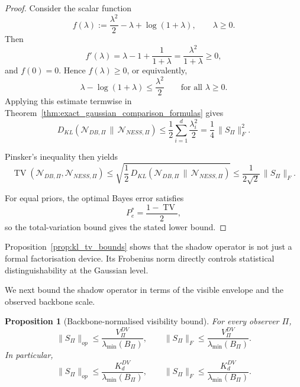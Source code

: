 \documentclass[11pt,a4paper]{article}
\numberwithin{equation}{section}
\theoremstyle{thmcompact}
\newtheorem{proposition}[theorem]{Proposition}
\theoremstyle{remark}
\begin{document}
\begin{proof}
Consider the scalar function
\begin{equation}
f(\lambda):=\frac{\lambda^2}{2}-\lambda+\log(1+\lambda),
\qquad \lambda\ge 0.
\end{equation}
Then
\begin{equation}
f'( \lambda)=\lambda-1+\frac{1}{1+\lambda}
=
\frac{\lambda^2}{1+\lambda}\ge 0,
\end{equation}
and \(f(0)=0\). Hence \(f(\lambda)\ge 0\), or equivalently,
\begin{equation}
\lambda-\log(1+\lambda)\le \frac{\lambda^2}{2}
\qquad\text{for all }\lambda\ge 0.
\end{equation}
Applying this estimate termwise in Theorem~\ref{thm:exact_gaussian_comparison_formulas} gives
\begin{equation}
D_{KL}\!\left(\mathcal N_{DB,\Pi}\,\|\,\mathcal N_{NESS,\Pi}\right)
\le
\frac12\sum_{i=1}^{d}\frac{\lambda_i^2}{2}
=
\frac14\,\|S_\Pi\|_F^2.
\end{equation}

Pinsker's inequality then yields
\begin{equation}
\operatorname{TV}\!\left(\mathcal N_{DB,\Pi},\mathcal N_{NESS,\Pi}\right)
\le
\sqrt{\frac12\,D_{KL}\!\left(\mathcal N_{DB,\Pi}\,\|\,\mathcal N_{NESS,\Pi}\right)}
\le
\frac{1}{2\sqrt2}\,\|S_\Pi\|_F.
\end{equation}

For equal priors, the optimal Bayes error satisfies
\begin{equation}
P_e^\ast=\frac{1-\operatorname{TV}}{2},
\end{equation}
so the total-variation bound gives the stated lower bound.
\end{proof}

Proposition~\ref{prop:kl_tv_bounds} shows that the shadow operator is not just a formal factorisation device. Its Frobenius norm directly controls statistical distinguishability at the Gaussian level.

We next bound the shadow operator in terms of the visible envelope and the observed backbone scale.

\begin{proposition}[Backbone-normalised visibility bound]
\label{prop:backbone_normalised_visibility_bound}
For every observer \(\Pi\),
\begin{equation}
\|S_\Pi\|_{op}
\le
\frac{V_\Pi^{DV}}{\lambda_{\min}(B_\Pi)},
\qquad
\|S_\Pi\|_{F}
\le
\frac{V_\Pi^{DV}}{\lambda_{\min}(B_\Pi)}.
\end{equation}
In particular,
\begin{equation}
\|S_\Pi\|_{op}
\le
\frac{K_d^{DV}}{\lambda_{\min}(B_\Pi)},
\qquad
\|S_\Pi\|_{F}
\le
\frac{K_d^{DV}}{\lambda_{\min}(B_\Pi)}.
\end{equation}
\end{proposition}
\end{document}
